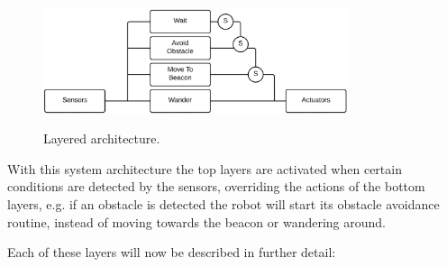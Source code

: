 \documentclass[oribibl]{llncs}
\begin{document}
\begin{figure}
  \centering
  \includegraphics[width=0.8\textwidth]{layer-architecture.png}
  \label{fig:layered}
  \caption{Layered architecture.}
\end{figure}

With this system architecture the top layers are activated when certain conditions are detected by the sensors, overriding the actions of the bottom layers, e.g. if an obstacle is detected the robot will start its obstacle avoidance routine, instead of moving towards the beacon or wandering around. 

Each of these layers will now be described in further detail:
\end{document}
